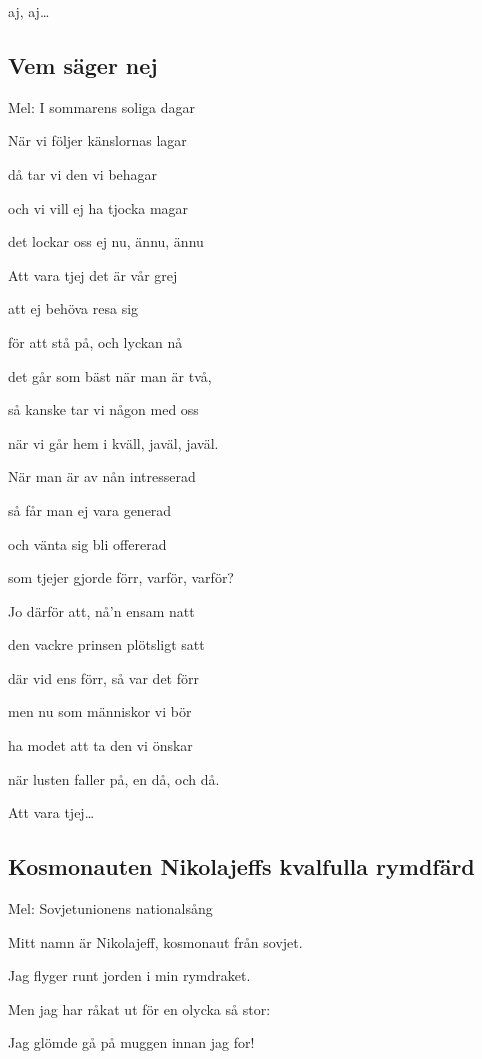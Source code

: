 aj, aj… \bigskip


\subsection{\textbf{Vem säger nej}}

Mel: I sommarens soliga dagar\bigskip

När vi följer känslornas lagar

då tar vi den vi behagar

och vi vill ej ha tjocka magar

det lockar oss ej nu, ännu, ännu\bigskip

Att vara tjej det är vår grej

att ej behöva resa sig

för att stå på, och lyckan nå

det går som bäst när man är två,

så kanske tar vi någon med oss

när vi går hem i kväll, javäl, javäl.\bigskip

När man är av nån intresserad

så får man ej vara generad

och vänta sig bli offererad

som tjejer gjorde förr, varför, varför?\bigskip

Jo därför att, nå’n ensam natt

den vackre prinsen plötsligt satt

där vid ens förr, så var det förr

men nu som människor vi bör

ha modet att ta den vi önskar

när lusten faller på, en då, och då.\bigskip

Att vara tjej…\bigskip

\subsection{\textbf{Kosmonauten Nikolajeffs kvalfulla rymdfärd}}

Mel: Sovjetunionens nationalsång\bigskip

Mitt namn är Nikolajeff, kosmonaut från sovjet.

Jag flyger runt jorden i min rymdraket.

Men jag har råkat ut för en olycka så stor:

Jag glömde gå på muggen innan jag for!\bigskip

